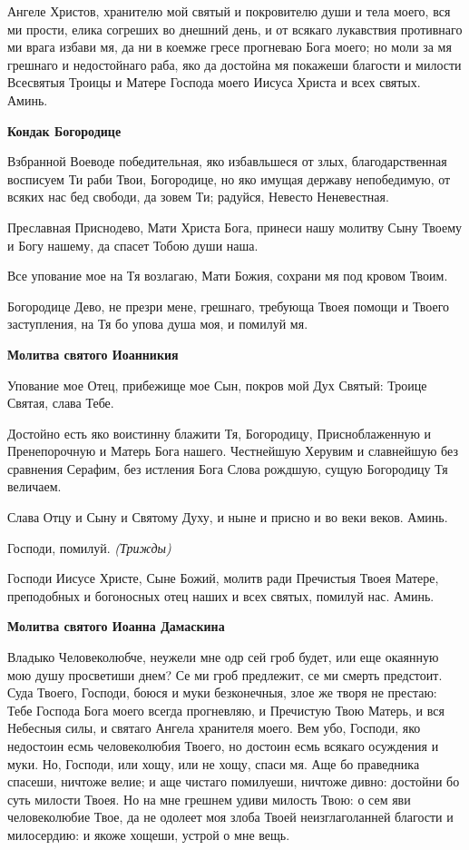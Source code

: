 Ангеле Христов, хранителю мой святый и покровителю души и тела моего, вся ми прости, елика согреших во днешний день, и от всякаго лукавствия противнаго ми врага избави мя, да ни в коемже гресе прогневаю Бога моего; но моли за мя грешнаго и недостойнаго раба, яко да достойна мя покажеши благости и милости Всесвятыя Троицы и Матере Господа моего Иисуса Христа и всех святых. Аминь.


\medskip
\bfseries Кондак Богородице\normalfont{}


Взбранной Воеводе победительная, яко избавльшеся от злых, благодарственная восписуем Ти раби Твои, Богородице, но яко имущая державу непобедимую, от всяких нас бед свободи, да зовем Ти; радуйся, Невесто Неневестная.


Преславная Приснодево, Мати Христа Бога, принеси нашу молитву Сыну Твоему и Богу нашему, да спасет Тобою души наша.


Все упование мое на Тя возлагаю, Мати Божия, сохрани мя под кровом Твоим.


Богородице Дево, не презри мене, грешнаго, требующа Твоея помощи и Твоего заступления, на Тя бо упова душа моя, и помилуй мя.


\medskip
\bfseries Молитва святого Иоанникия\normalfont{}


Упование мое Отец, прибежище мое Сын, покров мой Дух Святый: Троице Святая, слава Тебе.


Достойно есть яко воистинну блажити Тя, Богородицу, Присноблаженную и Пренепорочную и Матерь Бога нашего. Честнейшую Херувим и славнейшую без сравнения Серафим, без истления Бога Слова рождшую, сущую Богородицу Тя величаем.


Слава Отцу и Сыну и Святому Духу, и ныне и присно и во веки веков. Аминь.

 
Господи, помилуй. \itshape (Трижды)\normalfont{}


Господи Иисусе Христе, Сыне Божий, молитв ради Пречистыя Твоея Матере, преподобных и богоносных отец наших и всех святых, помилуй нас. Аминь.


\medskip
\bfseries Молитва святого Иоанна Дамаскина\normalfont{}


Владыко Человеколюбче, неужели мне одр сей гроб будет, или еще окаянную мою душу просветиши днем? Се ми гроб предлежит, се ми смерть предстоит. Суда Твоего, Господи, боюся и муки безконечныя, злое же творя не престаю: Тебе Господа Бога моего всегда прогневляю, и Пречистую Твою Матерь, и вся Небесныя силы, и святаго Ангела хранителя моего. Вем убо, Господи, яко недостоин есмь человеколюбия Твоего, но достоин есмь всякаго осуждения и муки. Но, Господи, или хощу, или не хощу, спаси мя. Аще бо праведника спасеши, ничтоже велие; и аще чистаго помилуеши, ничтоже дивно: достойни бо суть милости Твоея. Но на мне грешнем удиви милость Твою: о сем яви человеколюбие Твое, да не одолеет моя злоба Твоей неизглаголанней благости и милосердию: и якоже хощеши, устрой о мне вещь.


